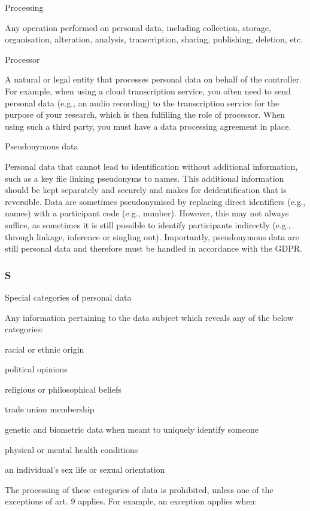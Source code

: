 \documentclass[
]{book}
\begin{document}
Processing

Any operation performed on personal data, including collection, storage, organisation, alteration, analysis,
transcription, sharing, publishing, deletion, etc.

Processor

A natural or legal entity that processes personal data on behalf of the controller. For example, when using
a cloud transcription service, you often need to send personal data (e.g., an audio recording) to the transcription
service for the purpose of your research, which is then fulfilling the role of processor. When using such a third party,
you must have a data processing agreement in place.

Pseudonymous data

Personal data that cannot lead to identification without additional information,
such as a key file linking pseudonyms to names. This additional information should be kept separately and securely
and makes for deidentification that is reversible. Data are sometimes pseudonymised by replacing direct identifiers
(e.g., names) with a participant code (e.g., number). However, this may not always suffice, as sometimes it is still
possible to identify participants indirectly (e.g., through linkage, inference or singling out). Importantly, pseudonymous
data are still personal data and therefore must be handled in accordance with the GDPR.

\hypertarget{s}{%
\subsubsection{S}\label{s}}

Special categories of personal data

Any information pertaining to the data subject which reveals any of the below categories:

racial or ethnic origin

political opinions

religious or philosophical beliefs

trade union membership

genetic and biometric data when meant to uniquely identify someone

physical or mental health conditions

an individual's sex life or sexual orientation

The processing of these categories of data is
prohibited, unless one of the exceptions of
art. 9 applies.
For example, an exception applies when:
\end{document}
